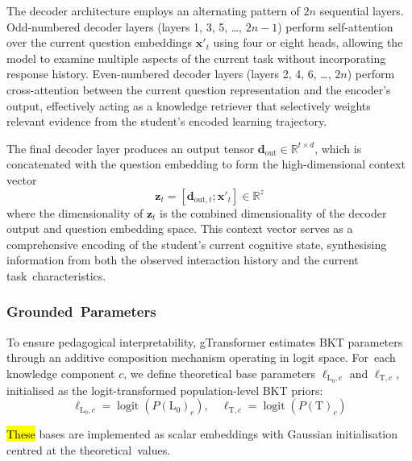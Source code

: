 \documentclass[applsci,article,accept,moreauthors,pdftex]{Definitions/mdpi}
\begin{document}
{The decoder architecture employs an alternating pattern of $2n$ sequential layers. Odd-numbered decoder layers (layers 1, 3, 5, \dots, $2n-1$) perform self-attention over the current question embeddings $\mathbf{x}'_t$ using four or eight heads, allowing the model to examine multiple aspects of the current task without incorporating response history. Even-numbered decoder layers (layers 2, 4, 6, \dots, $2n$) perform cross-attention between the current question representation and the encoder's output, effectively acting as a knowledge retriever that selectively weights relevant evidence from the student's encoded learning trajectory.}

The final decoder layer produces an output tensor $\mathbf{d}_{\text{out}} \in \mathbb{R}^{t \times d}$, which is concatenated with the question embedding to form the high-dimensional context vector
\begin{equation} \label{eq:context_vector}
    \mathbf{z}_t = [\mathbf{d}_{\text{out},t}; \mathbf{x}'_t] \in \mathbb{R}^{z}
\end{equation}
where the dimensionality of $\mathbf{z}_t$ is the combined dimensionality of the decoder output and question embedding space. 
This context vector serves as a comprehensive encoding of the student's current cognitive state, {synthesising} information from both the observed interaction history and the current task~characteristics.


\subsubsection{Grounded~Parameters} \label{sec_grounded_params}

To ensure pedagogical interpretability, gTransformer estimates BKT parameters through an additive composition mechanism operating in logit space. For~each knowledge component $c$, we define theoretical base parameters $\ell_{\text{L}_0,c}$ and $\ell_{\text{T},c}$, {initialised} as the logit-transformed population-level BKT priors:
\begin{equation} \label{eq:theory_base}
    \ell_{\text{L}_0,c} = \operatorname{logit}(P(\text{L}_0)_c), \quad \ell_{\text{T},c} = \operatorname{logit}(P(\text{T})_c)
\end{equation}

\hl{These} %
 bases are implemented as scalar embeddings with Gaussian {initialisation} {centred} at the theoretical~values.
\end{document}
